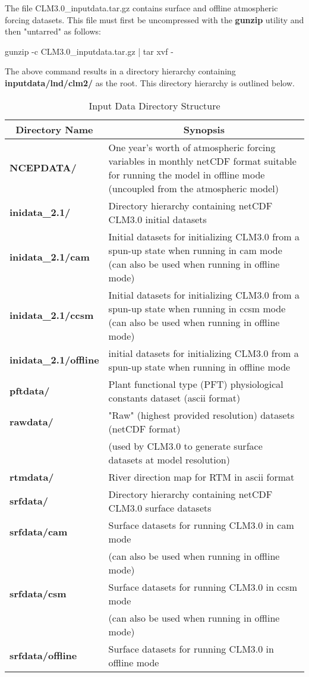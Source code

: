 \bigskip
The file CLM3.0\_inputdata.tar.gz contains surface and offline
atmospheric forcing datasets. This file must first be uncompressed
with the {\bf gunzip} utility and then "untarred" as follows:
\bigskip

	gunzip -c CLM3.0\_inputdata.tar.gz | tar xvf -

\bigskip
The above command results in a directory hierarchy containing {\bf
inputdata/lnd/clm2/} as the root.  This directory hierarchy is
outlined below.
\bigskip

\begin{longtable}{|p{1.5in}|p{4.5in}|}
\caption{\label{inputdata_directory} Input Data Directory Structure} \\
\hline
\endhead
\hline
\multicolumn{1}{|c|}{\bf Directory Name} & 
\multicolumn{1}{|c|}{\bf Synopsis}  \\ \hline 
{\bf NCEPDATA/}        & One year's worth of atmospheric forcing variables
                         in monthly netCDF format suitable for running the model
                         in offline mode (uncoupled from the atmospheric model)  \\ \hline
{\bf inidata\_2.1/}    & Directory hierarchy containing netCDF CLM3.0 initial datasets \\ \hline
{\bf inidata\_2.1/cam} & Initial datasets for initializing CLM3.0 from a spun-up state when
                         running in cam mode (can also be used when running in offline mode) \\ \hline
{\bf inidata\_2.1/ccsm}& Initial datasets for initializing CLM3.0 from a spun-up state when
                         running in ccsm mode (can also be used when running in offline mode) \\ \hline
{\bf inidata\_2.1/offline} & initial datasets for initializing CLM3.0 from a spun-up state when
                             running in offline mode \\ \hline
{\bf pftdata/}         & Plant functional type (PFT) physiological constants
                         dataset (ascii format) \\ \hline
{\bf rawdata/}         & "Raw" (highest provided resolution) datasets (netCDF format) \\ 
                       & (used by CLM3.0 to generate surface datasets at model resolution) \\ \hline 
{\bf rtmdata/}         & River direction map for RTM in ascii format \\ \hline
{\bf srfdata/}         & Directory hierarchy containing netCDF CLM3.0 surface datasets \\ \hline
{\bf srfdata/cam}      & Surface datasets for running CLM3.0 in cam mode \\ 
                       & (can also be used when running in offline mode) \\ \hline
{\bf srfdata/csm}      & Surface datasets for running CLM3.0 in ccsm mode \\ 
                       & (can also be used when running in offline mode) \\ \hline
{\bf srfdata/offline}  & Surface datasets for running CLM3.0 in offline mode \\ \hline
\end{longtable}

\bigskip
